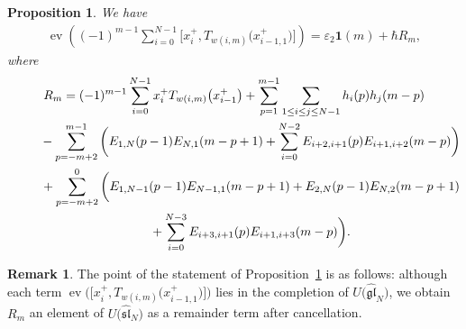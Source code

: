 \documentclass[pdftex]{sigma}
\newtheorem{prop}[thm]{Proposition}
\theoremstyle{definition}
\newtheorem{rem}[thm]{Remark}
\numberwithin{equation}{section}
\DeclareMathOperator{\ev}{ev}
\newcommand{\ve}{\varepsilon}
\newcommand{\gl}{\mathfrak{gl}}
\newcommand{\affsl}{\hat{\mathfrak{sl}}_N}
\newcommand{\bfid}{\mathbf{1}}
\begin{document}
\begin{prop}\label{prop:Heisenberg}
We have
\begin{gather}
\ev\left( (-1)^{m-1} \sum_{i=0}^{N-1} \big[x_{i}^+, T_{w(i,m)}\big(x_{i-1,1}^+\big)\big] \right) = \ve_2 \bfid(m) + \hbar R_m, \label{eq:Heisenberg}
\end{gather}
where
\begin{gather*}
R_m= (-1)^{m-1}\sum_{i=0}^{N-1} x_{i}^+ T_{w(i,m)}\big(x_{i-1}^+\big) + \sum_{p=1}^{m-1} \sum_{1 \leq i \leq j \leq N-1} h_i(p)h_j(m-p) \\
\hphantom{R_m=}{} - \sum_{p=-m+2}^{m-1} \bigg( E_{1,N}(p-1)E_{N,1}(m-p+1) + \sum_{i=0}^{N-2} E_{i+2,i+1}(p)E_{i+1,i+2}(m-p) \bigg) \\
\hphantom{R_m=}{} + \sum_{p=-m+2}^{0} \bigg( E_{1,N-1}(p-1)E_{N-1,1}(m-p+1) +E_{2,N}(p-1)E_{N,2}(m-p+1) \\
\hphantom{R_m=}{} + \sum_{i=0}^{N-3} E_{i+3,i+1}(p)E_{i+1,i+3}(m-p) \bigg).
\end{gather*}
\end{prop}

\begin{rem}The point of the statement of Proposition~\ref{prop:Heisenberg} is as follows: although each term $\ev\big(\big[x_{i}^+, T_{w(i,m)}\big(x_{i-1,1}^+\big)\big]\big)$ lies in the completion of $U\big(\hat{\gl}_N\big)$, we obtain $R_m$ an element of $U\big(\affsl\big)$ as a remainder term after cancellation.
\end{rem}
\end{document}
